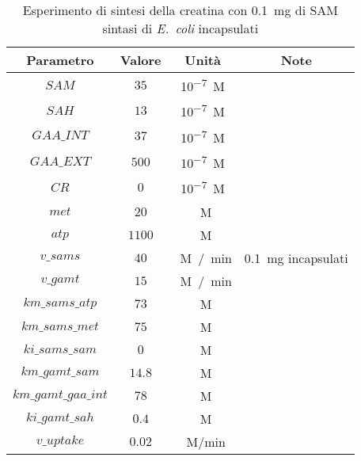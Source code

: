 \begin{table}[H]
	\centering
	\begin{tabular}{| c | c | c | c |}
	\hline
	Parametro & Valore & Unit\`a & Note \\
		\hline
		$SAM$ & $35$ & \si{10^{-7} M} & \\
		\hline
		$SAH$ & $13$ & \si{10^{-7} M} & \\
		\hline
		$GAA\_INT$ & $37$ & \si{10^{-7} M} & \\
		\hline
		$GAA\_EXT$ & $500$ & \si{10^{-7} M} & \\
		\hline
		$CR$ & $0$ & \si{10^{-7} M} & \\
		\hline
		$met$ & $20$ & \si{\mu M} & \\
		\hline
		$atp$ & $1100$ & \si{\mu M} & \\
		\hline
		$v\_sams$ & $40$ & \si{\mu M / min} & \SI{0.1}{mg} incapsulati \\
		\hline
		$v\_gamt$ & $15$ & \si{\mu M / min} & \\
		\hline
		$km\_sams\_atp$ & $73$ & \si{\mu M} & \\
		\hline
		$km\_sams\_met$ & $75$ & \si{\mu M} & \\
		\hline
		$ki\_sams\_sam$ & $0$ & \si{\mu M} & \\
		\hline
		$km\_gamt\_sam$ & $14.8$ & \si{\mu M} & \\
		\hline
		$km\_gamt\_gaa\_int$ & $78$ & \si{\mu M} & \\
		\hline
		$ki\_gamt\_sah$ & $0.4$ & \si{\mu M} & \\
		\hline
		$v\_uptake$ & $0.02$ & \si{\mu M/min} & \\
		\hline
	\end{tabular}
	\caption{Esperimento di sintesi della creatina con \SI{0.1}{mg} di SAM sintasi di \emph{E.\ coli} incapsulati}
	\label{mod:10}
\end{table}

